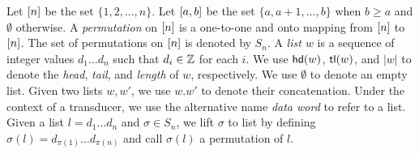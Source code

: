 Let $[n]$ be the set $\{ 1, 2, \ldots, n \}$. Let $[a,b]$ be the set $\{ a, a+1, \ldots, b \}$ when $b\geq a$ and $\emptyset$ otherwise. A \emph{permutation} on
$[n]$ is a one-to-one and onto mapping from $[n]$ to
$[n]$. The set of
permutations on $[n]$ is denoted by $S_n$.
A \emph{list $w$} is a sequence of integer values $d_1\ldots d_n$ such that $d_i \in {\mathbb{Z} }$ for each $i$.
We use $\mathsf{hd}(w)$, $\mathsf{tl}(w)$, and $|w|$ to denote the \emph{head}, \emph{tail}, and \emph{length} of $w$, respectively.
We use $\emptyset$ to denote an empty list.
Given two lists $w,w'$, we use $w.w'$ to denote their concatenation.
Under the context of a transducer, we use the alternative name \emph{data word} to refer to a list.
Given a list $l=d_1\ldots d_n$ and $\sigma \in S_n$, we lift $\sigma$ to list by defining $\sigma(l)=d_{\pi(1)} \ldots d_{\pi(n)}$ and call $\sigma(l)$ a permutation of $l$.